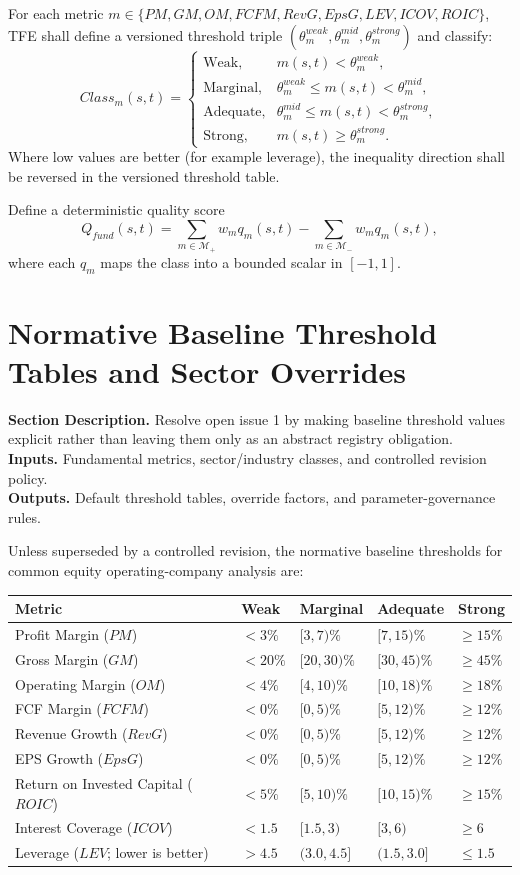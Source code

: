 \documentclass[11pt]{report}
\newcommand{\meta}[3]{\textbf{Section Description.} #1\\
\textbf{Inputs.} #2\\
\textbf{Outputs.} #3\par}
\begin{document}
For each metric $m\in\{PM,GM,OM,FCFM,RevG,EpsG,LEV,ICOV,ROIC\}$, TFE shall define a versioned threshold triple $(\theta_m^{weak},\theta_m^{mid},\theta_m^{strong})$ and classify:
\[
Class_m(s,t)=
\begin{cases}
\text{Weak}, & m(s,t) < \theta_m^{weak},\\
\text{Marginal}, & \theta_m^{weak}\le m(s,t)<\theta_m^{mid},\\
\text{Adequate}, & \theta_m^{mid}\le m(s,t)<\theta_m^{strong},\\
\text{Strong}, & m(s,t)\ge \theta_m^{strong}.
\end{cases}
\]
Where low values are better (for example leverage), the inequality direction shall be reversed in the versioned threshold table.

Define a deterministic quality score
\[
Q_{fund}(s,t)=\sum_{m\in\mathcal{M}_{+}} w_m q_m(s,t)-\sum_{m\in\mathcal{M}_{-}} w_m q_m(s,t),
\]
where each $q_m$ maps the class into a bounded scalar in $[-1,1]$.


\section{Normative Baseline Threshold Tables and Sector Overrides}
\meta{Resolve open issue 1 by making baseline threshold values explicit rather than leaving them only as an abstract registry obligation.}{Fundamental metrics, sector/industry classes, and controlled revision policy.}{Default threshold tables, override factors, and parameter-governance rules.}

Unless superseded by a controlled revision, the normative baseline thresholds for common equity operating-company analysis are:

\renewcommand{\arraystretch}{1.12}
\begin{longtable}{p{}p{}p{}p{}p{}}
\toprule
Metric & Weak & Marginal & Adequate & Strong \\
\midrule
Profit Margin ($PM$) & $<3\%$ & $[3,7)\%$ & $[7,15)\%$ & $\ge 15\%$ \\
Gross Margin ($GM$) & $<20\%$ & $[20,30)\%$ & $[30,45)\%$ & $\ge 45\%$ \\
Operating Margin ($OM$) & $<4\%$ & $[4,10)\%$ & $[10,18)\%$ & $\ge 18\%$ \\
FCF Margin ($FCFM$) & $<0\%$ & $[0,5)\%$ & $[5,12)\%$ & $\ge 12\%$ \\
Revenue Growth ($RevG$) & $<0\%$ & $[0,5)\%$ & $[5,12)\%$ & $\ge 12\%$ \\
EPS Growth ($EpsG$) & $<0\%$ & $[0,5)\%$ & $[5,12)\%$ & $\ge 12\%$ \\
Return on Invested Capital ($ROIC$) & $<5\%$ & $[5,10)\%$ & $[10,15)\%$ & $\ge 15\%$ \\
Interest Coverage ($ICOV$) & $<1.5$ & $[1.5,3)$ & $[3,6)$ & $\ge 6$ \\
Leverage ($LEV$; lower is better) & $>4.5$ & $(3.0,4.5]$ & $(1.5,3.0]$ & $\le 1.5$ \\
\bottomrule
\end{longtable}
\end{document}
